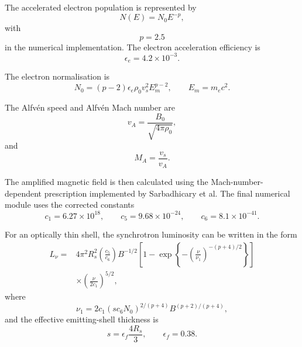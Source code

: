 \documentclass[
aps,
prd,
reprint,
superscriptaddress,
nofootinbib
]{revtex4-2}
\begin{document}
	The accelerated electron population is represented by
	\begin{equation}
		N(E)=N_0E^{-p},
	\end{equation}
	with
	\begin{equation}
		p=2.5
	\end{equation}
	in the numerical implementation.  The electron acceleration efficiency is
	\begin{equation}
		\epsilon_e=4.2\times10^{-3}.
	\end{equation}
	
	The electron normalisation is
	\begin{equation}
		N_0
		=
		(p-2)\epsilon_e\rho_0v_s^2
		E_m^{p-2},
		\qquad
		E_m=m_ec^2.
		\label{eq:electron}
	\end{equation}
	
	The Alfv\'en speed and Alfv\'en Mach number are
	\begin{equation}
		v_A=
		\frac{B_0}{\sqrt{4\pi\rho_0}},
	\end{equation}
	and
	\begin{equation}
		M_A=\frac{v_s}{v_A}.
	\end{equation}
	
	The amplified magnetic field is then calculated using the Mach-number-dependent
	prescription implemented by Sarbadhicary et al.  The final numerical module
	uses the corrected constants
	\begin{equation}
		c_1=6.27\times10^{18},
		\qquad
		c_5=9.68\times10^{-24},
		\qquad
		c_6=8.1\times10^{-41}.
	\end{equation}
	
	For an optically thin shell, the synchrotron luminosity can be written in the
	form
	\begin{align}
		L_\nu
		={}&
		4\pi^2R_s^2
		\left(\frac{c_5}{c_6}\right)
		B^{-1/2}
		\left[
		1-\exp\left\{
		-\left(\frac{\nu}{\nu_1}\right)^{-(p+4)/2}
		\right\}
		\right]
		\nonumber\\
		&\times
		\left(\frac{\nu}{2c_1}\right)^{5/2},
		\label{eq:luminosity}
	\end{align}
	where
	\begin{equation}
		\nu_1
		=
		2c_1
		(s c_6N_0)^{2/(p+4)}
		B^{(p+2)/(p+4)},
		\label{eq:nu1}
	\end{equation}
	and the effective emitting-shell thickness is
	\begin{equation}
		s=\epsilon_f\frac{4R_s}{3},
		\qquad
		\epsilon_f=0.38.
	\end{equation}
	
\end{document}
